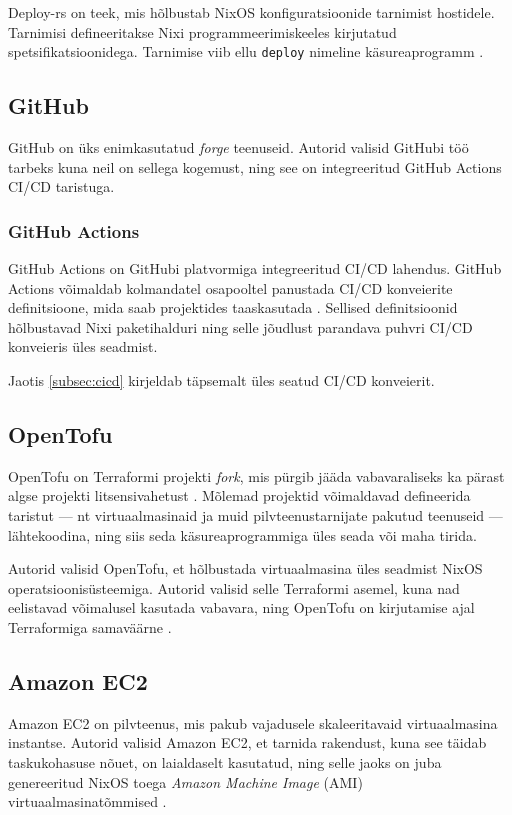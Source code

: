 Deploy-rs on teek, mis hõlbustab NixOS konfiguratsioonide tarnimist hostidele. Tarnimisi defineeritakse Nixi programmeerimiskeeles kirjutatud spetsifikatsioonidega. Tarnimise viib ellu \texttt{deploy} nimeline käsureaprogramm \cite{deploy-rs}.

\subsection{GitHub}

GitHub on üks enimkasutatud \emph{forge} teenuseid. Autorid valisid GitHubi töö tarbeks kuna neil on sellega kogemust, ning see on integreeritud GitHub Actions CI/CD taristuga.

\subsubsection{GitHub Actions}\label{subsubsec:github-actions}

GitHub Actions on GitHubi platvormiga integreeritud CI/CD lahendus. GitHub Actions võimaldab kolmandatel osapooltel panustada CI/CD konveierite definitsioone, mida saab projektides taaskasutada \cite{github-finding-actions}. Sellised definitsioonid hõlbustavad Nixi paketihalduri ning selle jõudlust parandava puhvri CI/CD konveieris üles seadmist.

Jaotis \ref{subsec:cicd} kirjeldab täpsemalt üles seatud CI/CD konveierit.

\subsection{OpenTofu}\label{subsec:opentofu}

OpenTofu on Terraformi projekti \emph{fork}, mis pürgib jääda vabavaraliseks ka pärast algse projekti litsensivahetust \cite{opentofu-faq-why}. Mõlemad projektid võimaldavad defineerida taristut — nt virtuaalmasinaid ja muid pilvteenustarnijate pakutud teenuseid — lähtekoodina, ning siis seda käsureaprogrammiga üles seada või maha tirida.

Autorid valisid OpenTofu, et hõlbustada virtuaalmasina üles seadmist NixOS operatsioonisüsteemiga. Autorid valisid selle Terraformi asemel, kuna nad eelistavad võimalusel kasutada vabavara, ning OpenTofu on kirjutamise ajal Terraformiga samaväärne \cite{opentofu-faq-terraform-replacement, opentofu-faq-state-file, opentofu-faq-providers}.

\subsection{Amazon EC2}\label{subsec:ec2}

Amazon EC2 on pilvteenus, mis pakub vajadusele skaleeritavaid virtuaalmasina instantse. Autorid valisid Amazon EC2, et tarnida rakendust, kuna see täidab taskukohasuse nõuet, on laialdaselt kasutatud, ning selle jaoks on juba genereeritud NixOS toega \emph{Amazon Machine Image} (AMI) virtuaalmasinatõmmised \cite{nixos-amis}.

